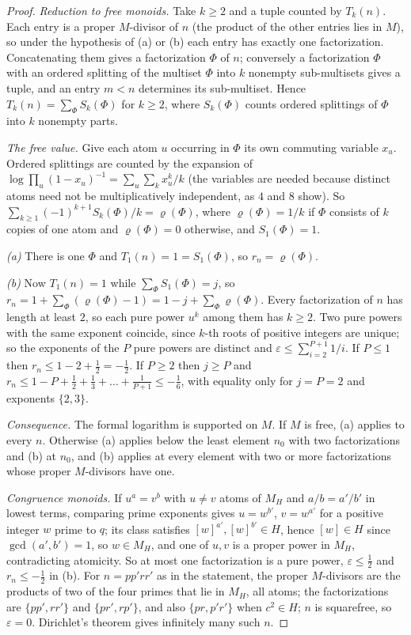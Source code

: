 \begin{proof}
\emph{Reduction to free monoids.} Take $k\ge2$ and a tuple counted by $T_k(n)$. Each entry is a proper $M$-divisor of $n$ (the product of the other entries lies in $M$), so under the hypothesis of (a) or (b) each entry has exactly one factorization. Concatenating them gives a factorization $\Phi$ of $n$; conversely a factorization $\Phi$ with an ordered splitting of the multiset $\Phi$ into $k$ nonempty sub-multisets gives a tuple, and an entry $m<n$ determines its sub-multiset. Hence $T_k(n)=\sum_\Phi S_k(\Phi)$ for $k\ge2$, where $S_k(\Phi)$ counts ordered splittings of $\Phi$ into $k$ nonempty parts.

\emph{The free value.} Give each atom $u$ occurring in $\Phi$ its own commuting variable $x_u$. Ordered splittings are counted by the expansion of $\log\prod_u(1-x_u)^{-1}=\sum_u\sum_kx_u^k/k$ (the variables are needed because distinct atoms need not be multiplicatively independent, as $4$ and $8$ show). So $\sum_{k\ge1}(-1)^{k+1}S_k(\Phi)/k=\varrho(\Phi)$, where $\varrho(\Phi)=1/k$ if $\Phi$ consists of $k$ copies of one atom and $\varrho(\Phi)=0$ otherwise, and $S_1(\Phi)=1$.

\emph{(a)} There is one $\Phi$ and $T_1(n)=1=S_1(\Phi)$, so $r_n=\varrho(\Phi)$.

\emph{(b)} Now $T_1(n)=1$ while $\sum_\Phi S_1(\Phi)=j$, so $r_n=1+\sum_\Phi(\varrho(\Phi)-1)=1-j+\sum_\Phi\varrho(\Phi)$.
Every factorization of $n$ has length at least $2$, so each pure power $u^k$ among them has $k\ge2$. Two pure powers with the same exponent coincide, since $k$-th roots of positive integers are unique; so the exponents of the $P$ pure powers are distinct and $\varepsilon\le\sum_{i=2}^{P+1}1/i$. If $P\le1$ then $r_n\le1-2+\tfrac12=-\tfrac12$. If $P\ge2$ then $j\ge P$ and $r_n\le1-P+\tfrac12+\tfrac13+\dots+\tfrac1{P+1}\le-\tfrac16$, with equality only for $j=P=2$ and exponents $\{2,3\}$.

\emph{Consequence.} The formal logarithm is supported on $M$. If $M$ is free, (a) applies to every $n$. Otherwise (a) applies below the least element $n_0$ with two factorizations and (b) at $n_0$, and (b) applies at every element with two or more factorizations whose proper $M$-divisors have one.

\emph{Congruence monoids.} If $u^a=v^b$ with $u\ne v$ atoms of $M_H$ and $a/b=a'/b'$ in lowest terms, comparing prime exponents gives $u=w^{b'}$, $v=w^{a'}$ for a positive integer $w$ prime to $q$; its class satisfies $[w]^{a'},[w]^{b'}\in H$, hence $[w]\in H$ since $\gcd(a',b')=1$, so $w\in M_H$, and one of $u,v$ is a proper power in $M_H$, contradicting atomicity. So at most one factorization is a pure power, $\varepsilon\le\tfrac12$ and $r_n\le-\tfrac12$ in (b). For $n=pp'rr'$ as in the statement, the proper $M$-divisors are the products of two of the four primes that lie in $M_H$, all atoms; the factorizations are $\{pp',rr'\}$ and $\{pr',rp'\}$, and also $\{pr,p'r'\}$ when $c^2\in H$; $n$ is squarefree, so $\varepsilon=0$. Dirichlet's theorem gives infinitely many such $n$.
\end{proof}

